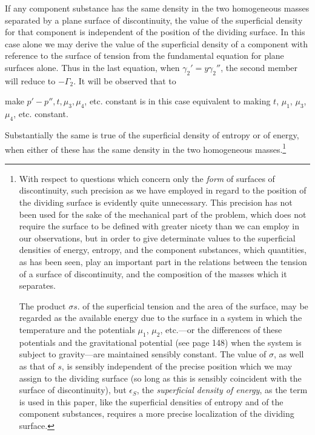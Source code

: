 \documentclass[12pt]{memoir}
\begin{document}
{If any component substance has the same density in the two homogeneous masses separated by a plane surface of discontinuity, the value of the superficial density for that component is independent of the position of the dividing surface. In this case alone we may derive the value of the superficial density of a component with reference to the surface of tension from the fundamental equation for plane surfaces alone. Thus in the last equation, when $\gamma_2'=y\gamma_2''$, the second member will reduce to $- \Gamma_{2}$. It will be observed that to



make $p'-p'',t,\mu_3,\mu_4$, etc. constant is in this case equivalent to making $t$, $\mu_1$, $\mu_3$, $\mu_4$, etc. constant.

Substantially the same is true of the superficial density of entropy or of energy, when either of these has the same density in the two
homogeneous masses.\footnote{With respect to questions which concern only the \textit{form} of surfaces of discontinuity, such precision as we have employed in regard to the position of the dividing surface is evidently quite unnecessary. This precision has not been used for the sake of the mechanical part of the problem, which does not require the surface to be defined with greater nicety than we can employ in our observations, but in order to give determinate values to the superficial densities of energy, entropy, and the component substances, which quantities, as has been seen, play an important part in the relations between the tension of a surface of discontinuity, and the composition of the masses which it separates.\par
The product $\sigma s$. of the superficial tension and the area of the surface, may be regarded as the available energy due to the surface in a system in which the temperature and the potentials $\mu_1$, $\mu_2$, etc.---or the differences of these potentials and the gravitational potential (see page 148) when the system is subject to gravity---are maintained sensibly constant. The value of $\sigma$, as well as that of $s$, is sensibly independent of the precise position which we may assign to the dividing surface (so long as this is sensibly coincident with the surface of discontinuity), but $\epsilon_S$, the \textit{superficial density of energy}, as the term is used in this paper, like the superficial densities of entropy and of the component substances, requires a more precise localization of the dividing surface.}

}
\end{document}

